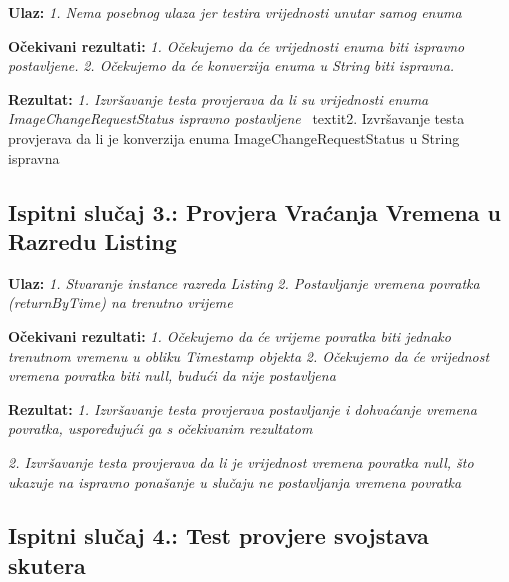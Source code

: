                                     \textbf{Ulaz:}
                                    \textit{1. Nema posebnog ulaza jer testira vrijednosti unutar samog enuma}

                                    \textbf{Očekivani rezultati:}
                                    \textit{1. Očekujemo da će vrijednosti enuma biti ispravno postavljene.}
                                    \textit{2. Očekujemo da će konverzija enuma u String biti ispravna.}

                                    \textbf{Rezultat:}
                                    \textit{1. Izvršavanje testa provjerava da li su vrijednosti enuma ImageChangeRequestStatus ispravno postavljene}
                                    ~textit{2. Izvršavanje testa provjerava da li je konverzija enuma ImageChangeRequestStatus u String ispravna}

			\subsection{Ispitni slučaj 3.: Provjera Vraćanja Vremena u Razredu Listing}

                                                \textbf{Ulaz:}
                                                \textit{1. Stvaranje instance razreda Listing}
                                                \textit{2. Postavljanje vremena povratka (returnByTime) na trenutno vrijeme}

                                                \textbf{Očekivani rezultati:}
                                                \textit{1. Očekujemo da će vrijeme povratka biti jednako trenutnom vremenu u obliku Timestamp objekta}
                                                \textit{2. Očekujemo da će vrijednost vremena povratka biti null, budući da nije postavljena}


                                                \textbf{Rezultat:}
                                                \textit{1. Izvršavanje testa provjerava postavljanje i dohvaćanje vremena povratka, uspoređujući ga s očekivanim rezultatom}

                                                \textit{2. Izvršavanje testa provjerava da li je vrijednost vremena povratka null, što ukazuje na ispravno ponašanje u slučaju ne postavljanja vremena povratka}

			\subsection{Ispitni slučaj 4.: Test provjere svojstava skutera}


